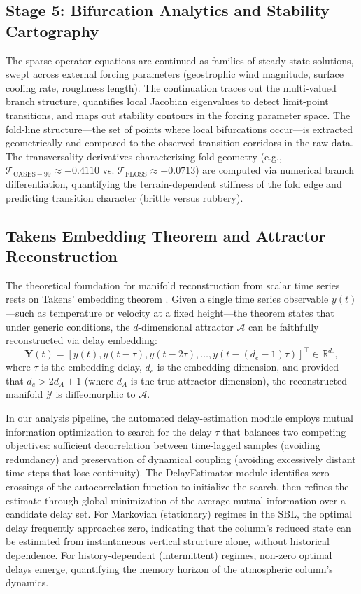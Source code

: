 \documentclass[12pt,a4paper]{article}
\newcommand{\vect}[1]{\mathbf{#1}}
\begin{document}
\subsection{Stage 5: Bifurcation Analytics and Stability Cartography}

The sparse operator equations are continued as families of steady-state solutions, swept across external forcing parameters (geostrophic wind magnitude, surface cooling rate, roughness length). The continuation traces out the multi-valued branch structure, quantifies local Jacobian eigenvalues to detect limit-point transitions, and maps out stability contours in the forcing parameter space. The fold-line structure---the set of points where local bifurcations occur---is extracted geometrically and compared to the observed transition corridors in the raw data. The transversality derivatives characterizing fold geometry (e.g., $\mathcal{T}_{\mathrm{CASES-99}} \approx -0.4110$ vs. $\mathcal{T}_{\mathrm{FLOSS}} \approx -0.0713$) are computed via numerical branch differentiation, quantifying the terrain-dependent stiffness of the fold edge and predicting transition character (brittle versus rubbery).

\subsection{Takens Embedding Theorem and Attractor Reconstruction}

The theoretical foundation for manifold reconstruction from scalar time series rests on Takens' embedding theorem \citep{takens1981}. Given a single time series observable $y(t)$---such as temperature or velocity at a fixed height---the theorem states that under generic conditions, the $d$-dimensional attractor $\mathcal{A}$ can be faithfully reconstructed via delay embedding:
\begin{equation}
\vect{Y}(t) = [y(t), y(t - \tau), y(t - 2\tau), \ldots, y(t - (d_e - 1)\tau)]^\top \in \mathbb{R}^{d_e},
\end{equation}
where $\tau$ is the embedding delay, $d_e$ is the embedding dimension, and provided that $d_e > 2d_A + 1$ (where $d_A$ is the true attractor dimension), the reconstructed manifold $\mathcal{Y}$ is diffeomorphic to $\mathcal{A}$.

In our analysis pipeline, the automated delay-estimation module employs mutual information optimization to search for the delay $\tau$ that balances two competing objectives: sufficient decorrelation between time-lagged samples (avoiding redundancy) and preservation of dynamical coupling (avoiding excessively distant time steps that lose continuity). The DelayEstimator module identifies zero crossings of the autocorrelation function to initialize the search, then refines the estimate through global minimization of the average mutual information over a candidate delay set. For Markovian (stationary) regimes in the SBL, the optimal delay frequently approaches zero, indicating that the column's reduced state can be estimated from instantaneous vertical structure alone, without historical dependence. For history-dependent (intermittent) regimes, non-zero optimal delays emerge, quantifying the memory horizon of the atmospheric column's dynamics.
\end{document}
